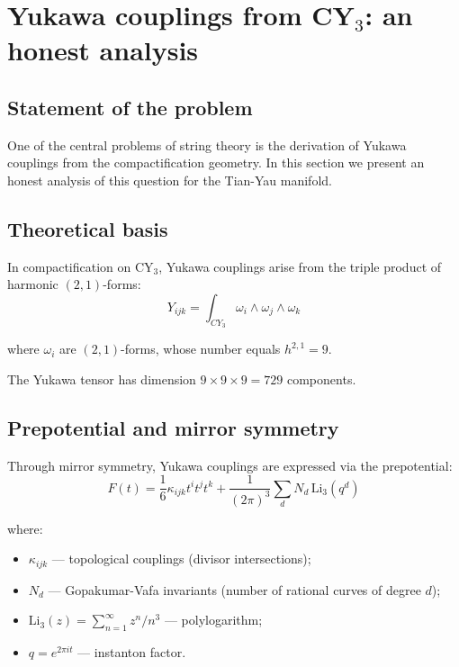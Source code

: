 \documentclass[12pt,a4paper,twoside]{article}
\theoremstyle{definition}
\begin{document}
\section{Yukawa couplings from \texorpdfstring{CY$_3$}{CY3}: an honest analysis}
\label{sec:yukawa}

\subsection{Statement of the problem}

One of the central problems of string theory is the derivation of Yukawa couplings from the compactification geometry. In this section we present an honest analysis of this question for the Tian-Yau manifold.

\subsection{Theoretical basis}

In compactification on CY$_3$, Yukawa couplings arise from the triple product of harmonic $(2,1)$-forms:
\begin{equation}
Y_{ijk} = \int_{CY_3} \omega_i \wedge \omega_j \wedge \omega_k
\label{eq:yukawa_def}
\end{equation}

where $\omega_i$ are $(2,1)$-forms, whose number equals $h^{2,1} = 9$.

The Yukawa tensor has dimension $9 \times 9 \times 9 = 729$ components.

\subsection{Prepotential and mirror symmetry}

Through mirror symmetry, Yukawa couplings are expressed via the prepotential:
\begin{equation}
F(t) = \frac{1}{6} \kappa_{ijk} t^i t^j t^k + \frac{1}{(2\pi)^3} \sum_d N_d \, \text{Li}_3(q^d)
\label{eq:prepotential}
\end{equation}

where:
\begin{itemize}
    \item $\kappa_{ijk}$ — topological couplings (divisor intersections);
    \item $N_d$ — Gopakumar-Vafa invariants (number of rational curves of degree $d$);
    \item $\text{Li}_3(z) = \sum_{n=1}^\infty z^n/n^3$ — polylogarithm;
    \item $q = e^{2\pi i t}$ — instanton factor.
\end{itemize}
\end{document}
